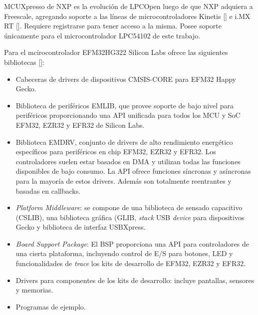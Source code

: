MCUXpresso de NXP es la evolución de LPCOpen luego de que NXP adquiera a Freescale,  agregando soporte a las líneas de microcontroladores Kinetis [] e i.MX RT []. Requiere registrarse para tener acceso a la misma. Posee soporte únicamente para el microcontrolador LPC54102 de este trabajo.


Para el mcirocontrolador EFM32HG322 Silicon Labs ofrece las siguientes bibliotecas []:

\begin{itemize}
\item
Cabeceras de drivers de dispositivos CMSIS-CORE para EFM32 Happy Gecko.
\item
Biblioteca de periféricos EMLIB, que provee soporte de bajo nivel para periféricos proporcionando una API unificada para todos los MCU y SoC EFM32, EZR32 y EFR32 de Silicon Labs.
\item
Biblioteca EMDRV, conjunto de drivers de alto rendimiento energético específicos para periféricos en chip EFM32, EZR32 y EFR32. Los controladores suelen estar basados en DMA y utilizan todas las funciones disponibles de bajo consumo. La API ofrece funciones síncronas y asíncronas para la mayoría de estos drivers. Además son totalmente reentrantes y basadas en callbacks.
\item
\emph{Platform Middleware}: se compone de una biblioteca de sensado capacitivo (CSLIB), una biblioteca gráfica (GLIB, \emph{stack} USB \emph{device} para dispositivos Gecko y biblioteca de interfaz USBXpress.
\item
\emph{Board Support Package}: El BSP proporciona una API para controladores de una cierta plataforma, incluyendo control de E/S para botones, LED y funcionalidades de \emph{trace} los kits de desarrollo de EFM32, EZR32 y EFR32.
\item
Drivers para componentes de los kits de desarrollo: incluye pantallas, sensores y memorias.
\item
Programas de ejemplo.
\end{itemize}

